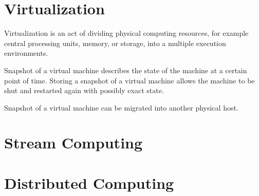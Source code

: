 




\section{Virtualization}
\label{section:virtualization}

Virtualization is an act of dividing physical computing resources, for example central processing units, memory, or storage, into a multiple execution environments.

Snapshot of a virtual machine describes the state of the machine at a certain point of time. Storing a snapshot of a virtual machine allows the machine to be shut and restarted again with possibly exact state.

Snapshot of a virtual machine can be migrated into another physical host.

\section{Stream Computing}


\section{Distributed Computing}


